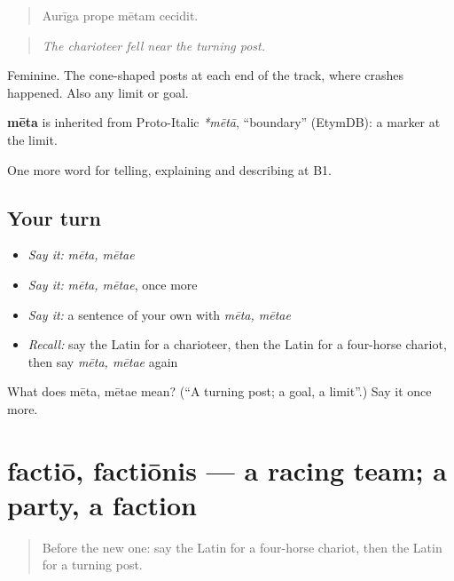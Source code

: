 \begin{quote}
Aurīga prope mētam cecidit.
\end{quote}

\begin{quote}
\emph{The charioteer fell near the turning post.}
\end{quote}

Feminine. The cone-shaped posts at each end of the track, where crashes happened. Also any limit or goal.

\begin{cousinweb}
\textbf{mēta} is inherited from Proto-Italic \emph{*mētā}, \textquotedblleft{}boundary\textquotedblright{} (EtymDB): a marker at the limit.
\end{cousinweb}

\begin{grammarlens}[title={What you've built}]
One more word for telling, explaining and describing at B1.
\end{grammarlens}

\subsection*{Your turn}
\begin{itemize}
\raggedright
  \item \emph{Say it:} \emph{mēta, mētae}
  \item \emph{Say it:} \emph{mēta, mētae}, once more
  \item \emph{Say it:} a sentence of your own with \emph{mēta, mētae}
  \item \emph{Recall:} say the Latin for a charioteer, then the Latin for a four-horse chariot, then say \emph{mēta, mētae} again
\end{itemize}

\begin{tcolorbox}[breakable,colback=teal!4,colframe=teal!35!black,title={Before you move on}]
What does mēta, mētae mean? (\textquotedblleft{}A turning post; a goal, a limit\textquotedblright{}.) Say it once more.
\end{tcolorbox}
\section[factiō, factiōnis]{factiō, factiōnis — a racing team; a party, a faction}

\label{lesson:LA-C335-factio}



\begin{quote}
Before the new one: say the Latin for a four-horse chariot, then the Latin for a turning post.
\end{quote}

